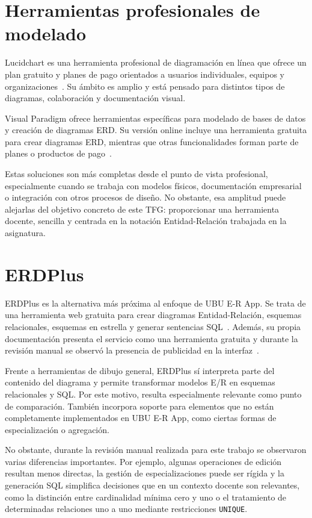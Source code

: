 \section{Herramientas profesionales de modelado}

Lucidchart es una herramienta profesional de diagramación en línea que ofrece un plan gratuito y planes de pago orientados a usuarios individuales, equipos y organizaciones~\cite{lucidchartPricing}. Su ámbito es amplio y está pensado para distintos tipos de diagramas, colaboración y documentación visual.

Visual Paradigm ofrece herramientas específicas para modelado de bases de datos y creación de diagramas ERD. Su versión online incluye una herramienta gratuita para crear diagramas ERD, mientras que otras funcionalidades forman parte de planes o productos de pago~\cite{visualParadigmERD,visualParadigmPricing}.

Estas soluciones son más completas desde el punto de vista profesional, especialmente cuando se trabaja con modelos físicos, documentación empresarial o integración con otros procesos de diseño. No obstante, esa amplitud puede alejarlas del objetivo concreto de este TFG: proporcionar una herramienta docente, sencilla y centrada en la notación Entidad-Relación trabajada en la asignatura.

\section{ERDPlus}

ERDPlus es la alternativa más próxima al enfoque de UBU E-R App. Se trata de una herramienta web gratuita para crear diagramas Entidad-Relación, esquemas relacionales, esquemas en estrella y generar sentencias SQL~\cite{erdplus}. Además, su propia documentación presenta el servicio como una herramienta gratuita y durante la revisión manual se observó la presencia de publicidad en la interfaz~\cite{erdplus,erdplusTerms}.

Frente a herramientas de dibujo general, ERDPlus sí interpreta parte del contenido del diagrama y permite transformar modelos E/R en esquemas relacionales y SQL. Por este motivo, resulta especialmente relevante como punto de comparación. También incorpora soporte para elementos que no están completamente implementados en UBU E-R App, como ciertas formas de especialización o agregación.

No obstante, durante la revisión manual realizada para este trabajo se observaron varias diferencias importantes. Por ejemplo, algunas operaciones de edición resultan menos directas, la gestión de especializaciones puede ser rígida y la generación SQL simplifica decisiones que en un contexto docente son relevantes, como la distinción entre cardinalidad mínima cero y uno o el tratamiento de determinadas relaciones uno a uno mediante restricciones \texttt{UNIQUE}.

